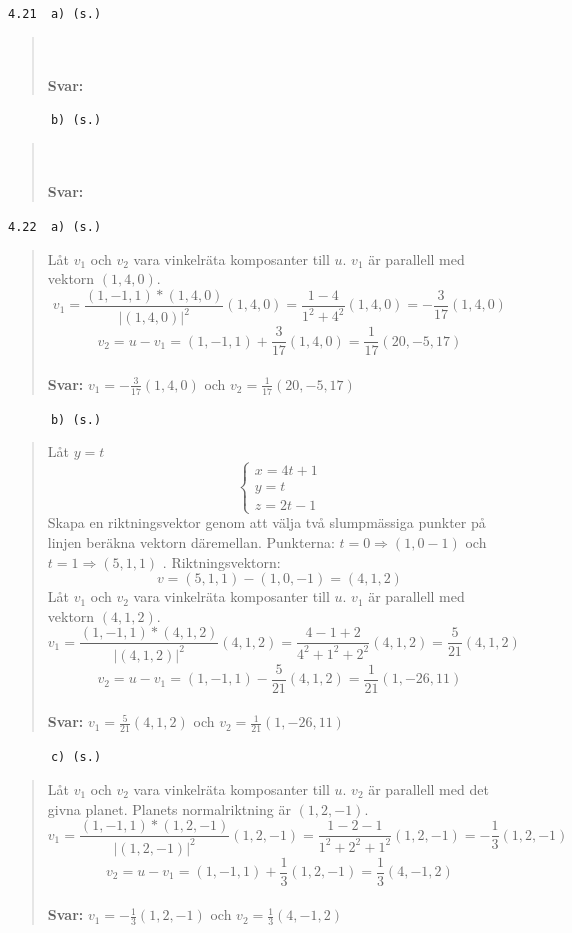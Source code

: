 \documentclass[a4paper]{article}
\newcommand{\tskcol}[1]{\textcolor{tskcol}{#1}}
\begin{document}
\texttt{\tskcol{4.21~~a) (s.)}}
\begin{quotation}
	\noindent
	\\ \\
	\textbf{Svar:}
\end{quotation}

\texttt{\tskcol{~~~~~~b) (s.)}}
\begin{quotation}
	\noindent
	\\ \\
	\textbf{Svar:}
\end{quotation}

\pagebreak
\texttt{\tskcol{4.22~~a) (s.)}}
\begin{quotation}
	\noindent
	Låt $v_1$ och $v_2$ vara vinkelräta komposanter till $u$. $v_1$ är parallell med vektorn $(1,4,0)$.
	\[v_1=\frac{(1,-1,1)*(1,4,0)}{|(1,4,0)|^2}(1,4,0)=
	\frac{1-4}{1^2+4^2}(1,4,0)=
	-\frac{3}{17}(1,4,0)\]
	\[v_2=u-v_1=(1,-1,1)+\frac{3}{17}(1,4,0)=\frac{1}{17}(20,-5,17)\]
	\\
	\textbf{Svar:} $v_1=-\frac{3}{17}(1,4,0)$ och $v_2=\frac{1}{17}(20,-5,17)$
\end{quotation}

\texttt{\tskcol{~~~~~~b) (s.)}}
\begin{quotation}
	\noindent
	Låt $y=t$
	\[\begin{cases}
	x=4t+1 \\
	y=t \\
	z=2t-1
	\end{cases}\]
	Skapa en riktningsvektor genom att välja två slumpmässiga punkter på linjen beräkna vektorn däremellan.
	Punkterna: $t=0 \Rightarrow (1,0-1)$ och $t=1 \Rightarrow (5,1,1)$ . Riktningsvektorn:
	\[v = (5,1,1)-(1,0,-1)=(4,1,2)\]
	Låt $v_1$ och $v_2$ vara vinkelräta komposanter till $u$. $v_1$ är parallell med vektorn $(4,1,2)$.
	\[v_1=\frac{(1,-1,1)*(4,1,2)}{|(4,1,2)|^2}(4,1,2)=
	\frac{4-1+2}{4^2+1^2+2^2}(4,1,2)=
	\frac{5}{21}(4,1,2)\]
	\[v_2=u-v_1=
	(1,-1,1)-\frac{5}{21}(4,1,2)=
	\frac{1}{21}(1,-26,11)\]
	\\ 
	\textbf{Svar:} $v_1=\frac{5}{21}(4,1,2)$ och $v_2=\frac{1}{21}(1,-26,11)$
\end{quotation}

\texttt{\tskcol{~~~~~~c) (s.)}}
\begin{quotation}
	\noindent
	Låt $v_1$ och $v_2$ vara vinkelräta komposanter till $u$. $v_2$ är parallell med det givna planet.
	Planets normalriktning är $(1,2,-1)$.
	\[v_1=\frac{(1,-1,1)*(1,2,-1)}{|(1,2,-1)|^2}(1,2,-1)=
	\frac{1-2-1}{1^2+2^2+1^2}(1,2,-1)=
	-\frac{1}{3}(1,2,-1)\]
	\[v_2=u-v_1=(1,-1,1)+\frac{1}{3}(1,2,-1)=\frac{1}{3}(4,-1,2)\]
	\\
	\textbf{Svar:} $v_1=-\frac{1}{3}(1,2,-1)$ och $v_2=\frac{1}{3}(4,-1,2)$
\end{quotation}
\end{document}
